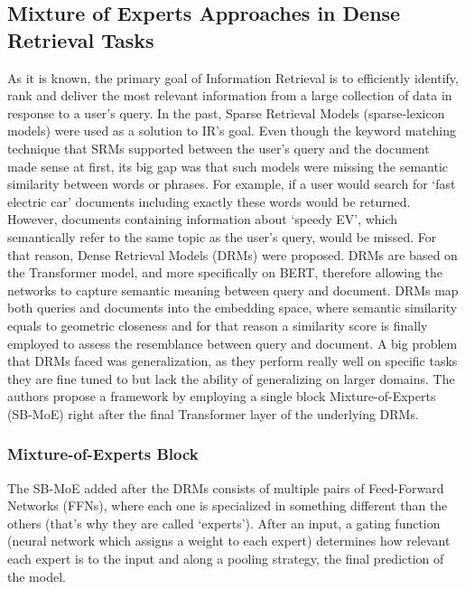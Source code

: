 \documentclass[a4paper,12pt]{article}
\begin{document}
\subsection{Mixture of Experts Approaches in Dense Retrieval Tasks}
As it is known, the primary goal of Information Retrieval is to efficiently identify, rank and deliver the most relevant information from a large collection of data in response to a user's query. In the past, Sparse Retrieval Models (sparse-lexicon models) were used as a solution to IR's goal. Even though the keyword matching technique that SRMs supported between the user's query and the document made sense at first, its big gap was that such models were missing the semantic similarity between words or phrases. For example, if a user would search for `fast electric car' documents including exactly these words would be returned. However, documents containing information about `speedy EV', which semantically refer to the same topic as the user's query, would be missed. For that reason, Dense Retrieval Models (DRMs) were proposed. DRMs are based on the Transformer model, and more specifically on BERT, therefore allowing the networks to capture semantic meaning between query and document. DRMs map both queries and documents into the embedding space, where semantic similarity equals to geometric closeness and for that reason a similarity score is finally employed to assess the resemblance between query and document. A big problem that DRMs faced was generalization, as they perform really well on specific tasks they are fine tuned to but lack the ability of generalizing on larger domains. The authors propose a framework by employing a single block Mixture-of-Experts (SB-MoE) right after the final Transformer layer of the underlying DRMs.

\subsubsection{Mixture-of-Experts Block}
The SB-MoE added after the DRMs consists of multiple pairs of Feed-Forward Networks (FFNs), where each one is specialized in something different than the others (that's why they are called `experts'). After an input, a gating function (neural network which assigns a weight to each expert) determines how relevant each expert is to the input and along a pooling strategy, the final prediction of the model.
\end{document}
